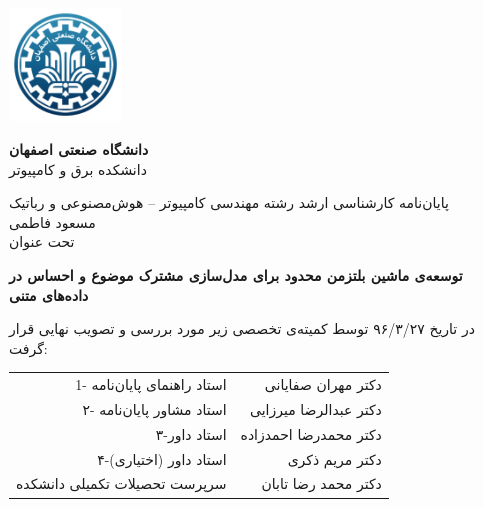 \thispagestyle{empty}
\begin{center}
\includegraphics[height=3cm]{firstpage-img/IUTLogoFA}

{\large
	\textbf{دانشگاه صنعتی اصفهان}\\
	دانشکده  برق و کامپیوتر
}
	
	\vfill
	
	{\Large
		پایان‌نامه کارشناسی ارشد رشته مهندسی کامپیوتر -- هوش‌مصنوعی و رباتیک \\
		\vspace{.3cm}
		مسعود فاطمی\\
		\vspace{.3cm}
		تحت عنوان\\
	}
\end{center}

\begin{center}
	{\large
		\textbf{ توسعه‌ی ماشین بلتزمن محدود برای مدل‌سازی مشترک موضوع و احساس در داده‌های متنی}
	}
\end{center}
\vspace*{1.8cm}
در تاریخ ۹۶/۳/۲۷ توسط کمیته‌ی تخصصی زیر مورد بررسی و تصویب نهایی قرار گرفت:\\

{\normalsize
	
	\begin{tabular}{rr}
		\vspace*{.8cm}
		1- استاد راهنمای پایان‌نامه  & \hspace{2cm} دکتر مهران صفایانی \\
		\vspace{.8cm}
		۲- استاد مشاور پایان‌نامه &\hspace{2cm} دکتر عبدالرضا میرزایی \\
		\vspace{.8cm}
		۳-استاد داور  &\hspace{2cm}  دکتر محمدرضا احمدزاده\\
		\vspace{.8cm}
		۴-استاد داور (اختیاری) &\hspace{2cm}  دکتر مریم ذکری \\
		\vspace{.8cm}
		سرپرست تحصیلات تکمیلی دانشکده &\hspace{2cm} دکتر محمد رضا تابان \\
	\end{tabular}
}
\restoregeometry
\pagebreak



